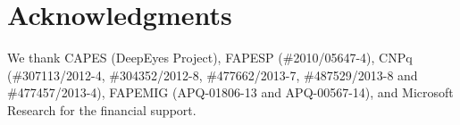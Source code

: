\section*{Acknowledgments}
We thank CAPES (DeepEyes Project), FAPESP (\#2010/05647-4), CNPq (\#307113/2012-4, \#304352/2012-8, \#477662/2013-7, \#487529/2013-8 and \#477457/2013-4), FAPEMIG (APQ-01806-13 and APQ-00567-14), and Microsoft Research for the financial support.